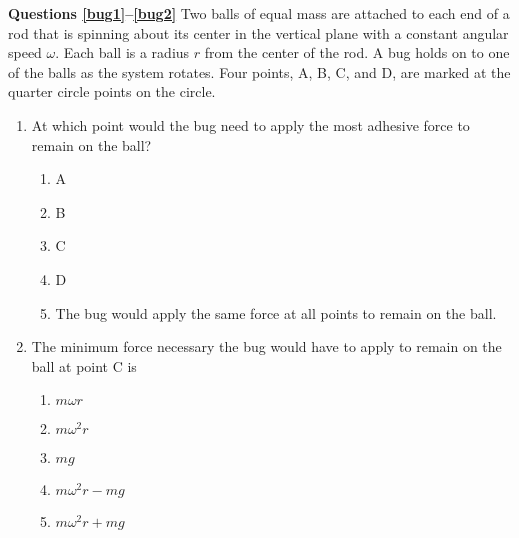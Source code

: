 \documentclass{../../../oss-apphys}
\begin{document}
\begin{multicols*}{2}
  \begin{center}
  \end{center}
  \textbf{Questions \ref{bug1}--\ref{bug2}} Two balls of equal mass are attached
  to each end of a rod that is spinning about its center in the vertical plane
  with a constant angular speed $\omega$. Each ball is a radius $r$ from the
  center of the rod. A bug holds on to one of the balls as the system rotates.
  Four points, A, B, C, and D, are marked at the quarter circle points on the
  circle.
  \begin{enumerate}[leftmargin=18pt,resume]
  \item At which point would the bug need to apply the most adhesive force to
    remain on the ball?
    \begin{enumerate}[nosep,leftmargin=18pt,label=(\Alph*)]
    \item A
    \item B
    \item C
    \item D
    \item The bug would apply the same force at all points to remain on the
      ball.
    \end{enumerate}
    \label{bug1}
    
  \item The minimum force necessary the bug would have to apply to remain
    on the ball at point C is
    \begin{enumerate}[nosep,leftmargin=18pt,label=(\Alph*)]
    \item $m\omega r$
    \item $m\omega^2r$
    \item $mg$
    \item $m\omega^2r-mg$
    \item $m\omega^2r+mg$
    \end{enumerate}
    \label{bug2}
  \end{enumerate}
\end{multicols*}
\newpage

\end{document}
